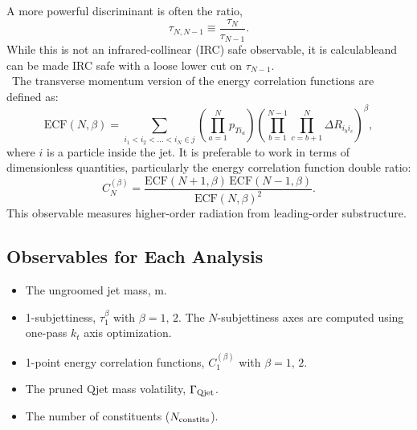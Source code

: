 A more powerful discriminant is often the ratio,
%
\begin{equation}
\tau_{N,N-1} \equiv \frac{\tau_N}{\tau_{N-1}}.
\end{equation}
%
While this is not an infrared-collinear (IRC) safe observable, it is calculable and can be made IRC safe with a loose lower cut on $\tau_{N-1}$.\\


~The transverse momentum version of the energy correlation functions are defined as:
%
\begin{equation}
\mathrm{ECF}(N,\beta) = \sum_{i_1 < i_2<\ldots<i_N \in j} \left(\prod_{a=1}^N p_{T i_a}\right)\left( \prod_{b=1}^{N-1} \prod_{c=b+1}^N \Delta R_{i_b i_c}\right)^\beta,
\end{equation}
%
where $i$ is a particle inside the jet. It is preferable to work in terms of dimensionless quantities, particularly the energy correlation function double ratio:
%
\begin{equation}
C_N^{(\beta)} = \frac{\mathrm{ECF}(N+1,\beta)\,\mathrm{ECF}(N-1,\beta)}{\mathrm{ECF}(N,\beta)^2}.
\end{equation}
%
This observable measures higher-order radiation from leading-order substructure. 

\subsection{Observables for Each Analysis}
\label{sec:observables}

\begin{itemize}
\item The ungroomed jet mass, m.
\item 1-subjettiness, $\tau_1^{\beta}$ with $\beta=1,\,2$. The $N$-subjettiness axes are computed using one-pass $k_t$ axis optimization.
\item 1-point energy correlation functions, $C_1^{(\beta)}$ with $\beta=1,\,2$.
\item The pruned Qjet mass volatility, $\Gamma_{\rm Qjet}$.
\item The number of constituents ($N_{\rm constits}$).
\end{itemize}

